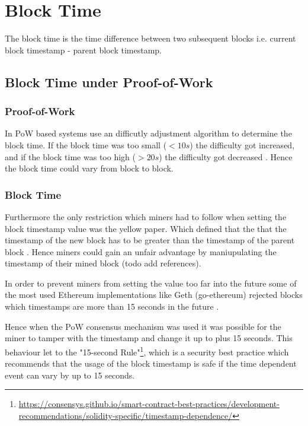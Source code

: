 
\section{Block Time}

The block time is the time difference between two subsequent blocks i.e.
current block timestamp - parent block timestamp.

\subsection{Block Time under Proof-of-Work}

\subsubsection{Proof-of-Work}

In PoW based systems use an difficutly adjustment algorithm to determine the
block time. If the block time was too small ($<10s$) the difficulty got
increased, and if the block time was too high ($>20s$) the difficulty got
decreased \cite{eip-2}. Hence the block time could vary from block to block.

\subsubsection{Block Time}

Furthermore the only restriction which miners had to follow when setting the 
block timestamp value was the yellow paper. Which defined that the that
the timestamp of the new block has to be greater than the timestamp of the
parent block \cite{ethyellowpaper2023}. Hence miners could gain an unfair
advantage by maniupulating the timestamp of their mined block (todo add
references).

In order to prevent miners from setting the value too far into the future some
of the most used Ethereum implementations like Geth (go-ethereum) rejected
blocks which timestamps are more than 15 seconds in the future
\cite{go-ethereum-15-sek-limit}. 

Hence when the PoW consensus mechanism was used it was possible for the miner
to tamper with the timestamp and change it up to plus 15 seconds. This
behaviour let to the "15-second
Rule"\footnote{\url{https://consensys.github.io/smart-contract-best-practices/development-recommendations/solidity-specific/timestamp-dependence/}},
which is a security best practice which recommends that the usage of the block
timestamp is safe if the time dependent event can vary by up to 15 seconds.



